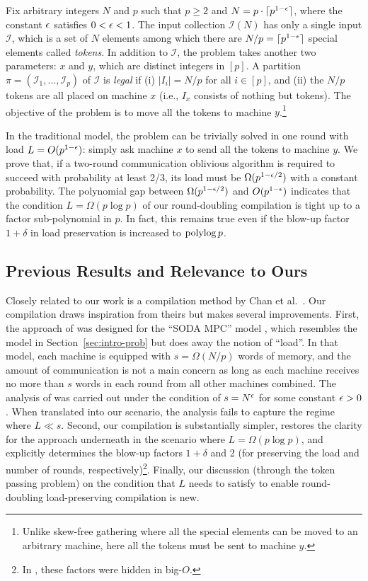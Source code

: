 \documentclass[sigconf]{acmart}
\def\vgap{\vspace{0mm}}
\def\I{\mathcal{I}}
\def\II{\mathscr{I}}
\begin{document}
Fix arbitrary integers $N$ and $p$ such that $p \ge 2$ and $N = p \cdot \lceil p^{1-\epsilon} \rceil$, where the constant $\epsilon$ satisfies $0 < \epsilon < 1$. The input collection $\II(N)$ has only a single input $\I$, which is a set of $N$ elements among which there are $N / p = \lceil p^{1-\epsilon} \rceil$ special elements called {\em tokens}. In addition to $\I$, the problem takes another two parameters: $x$ and $y$, which are distinct integers in $[p]$. A partition $\pi = (\I_1, ..., \I_p)$ of $\I$ is {\em legal} if (i) $|I_i| = N/p$ for all $i \in [p]$, and (ii) the $N/p$ tokens are all placed on machine $x$ (i.e., $I_x$ consists of nothing but tokens). The objective of the problem is to move all the tokens to machine $y$.\footnote{Unlike skew-free gathering where all the special elements can be moved to an arbitrary machine, here all the tokens must be sent to machine $y$.}

\vgap

In the traditional model, the problem can be trivially solved in one round with load $L = O(p^{1-\epsilon})$: simply ask machine $x$ to send all the tokens to machine $y$. We prove that, if a two-round communication oblivious algorithm is required to succeed with probability at least 2/3, its load must be $\Omega(p^{1-\epsilon/2})$ with a constant probability. The polynomial gap between $\Omega(p^{1-\epsilon/2})$ and $O(p^{1-\epsilon})$ indicates that the condition $L = \Omega(p \log p)$ of our round-doubling compilation  is tight up to a factor sub-polynomial in $p$. In fact, this remains true even if the blow-up factor $1+\delta$ in load preservation is increased to $\operatorname*{polylog} p$. 

\subsection{Previous Results and Relevance to Ours} \label{sec:intro-prev}

Closely related to our work is a compilation method by Chan et al.\ \cite{ccls20}. Our compilation draws inspiration from theirs but makes several improvements. First, the approach of \cite{ccls20} was designed for the ``SODA MPC'' model \cite{ksv10}, which resembles the model in Section~\ref{sec:intro-prob} but does away the notion of ``load''. In that model, each machine is equipped with $s = \Omega(N/p)$ words of memory, and the amount of communication is not a main concern as long as each machine receives no more than $s$ words in each round from all other machines combined. The analysis of \cite{ccls20} was carried out under the condition of $s = N^\epsilon$ for some constant $\epsilon > 0$. When translated into our scenario, the analysis fails to capture the regime where $L \ll s$. Second, our compilation is substantially simpler, restores the clarity for the approach underneath \cite{ccls20} in the scenario where $L = \Omega(p \log p)$, and explicitly determines the blow-up factors $1+\delta$ and 2 (for preserving the load and number of rounds, respectively)\footnote{In \cite{ccls20}, these factors were hidden in big-$O$.}. Finally, our discussion (through the token passing problem) on the condition that $L$ needs to satisfy to enable round-doubling load-preserving compilation is new.
\end{document}
